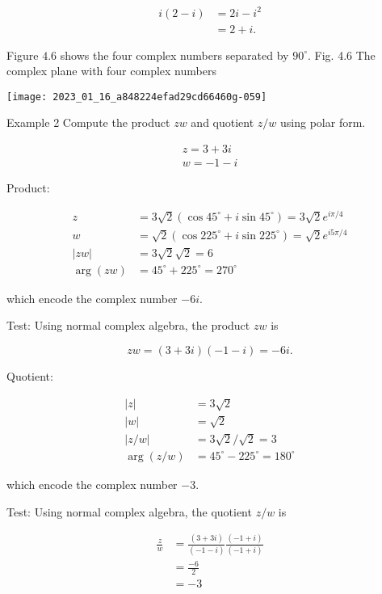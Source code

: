 $$
\begin{aligned}
i(2-i) & =2 i-i^{2} \\
& =2+i .
\end{aligned}
$$

Figure $4.6$ shows the four complex numbers separated by $90^{\circ}$. Fig. 4.6 The complex plane with four complex numbers

\begin{center}
\texttt{[image: 2023\_01\_16\_a848224efad29cd66460g-059]}
\end{center}

Example 2 Compute the product $z w$ and quotient $z / w$ using polar form.

$$
\begin{gathered}
z=3+3 i \\
w=-1-i
\end{gathered}
$$

Product:

$$
\begin{aligned}
z & =3 \sqrt{2}\left(\cos 45^{\circ}+i \sin 45^{\circ}\right)=3 \sqrt{2} e^{i \pi / 4} \\
w & =\sqrt{2}\left(\cos 225^{\circ}+i \sin 225^{\circ}\right)=\sqrt{2} e^{i 5 \pi / 4} \\
|z w| & =3 \sqrt{2} \sqrt{2}=6 \\
\arg (z w) & =45^{\circ}+225^{\circ}=270^{\circ}
\end{aligned}
$$

which encode the complex number $-6 i$.

Test: Using normal complex algebra, the product $z w$ is

$$
z w=(3+3 i)(-1-i)=-6 i .
$$

Quotient:

$$
\begin{aligned}
|z| & =3 \sqrt{2} \\
|w| & =\sqrt{2} \\
|z / w| & =3 \sqrt{2} / \sqrt{2}=3 \\
\arg (z / w) & =45^{\circ}-225^{\circ}=180^{\circ}
\end{aligned}
$$

which encode the complex number $-3$.

Test: Using normal complex algebra, the quotient $z / w$ is

$$
\begin{aligned}
\frac{z}{w} & =\frac{(3+3 i)}{(-1-i)} \frac{(-1+i)}{(-1+i)} \\
& =\frac{-6}{2} \\
& =-3
\end{aligned}
$$

